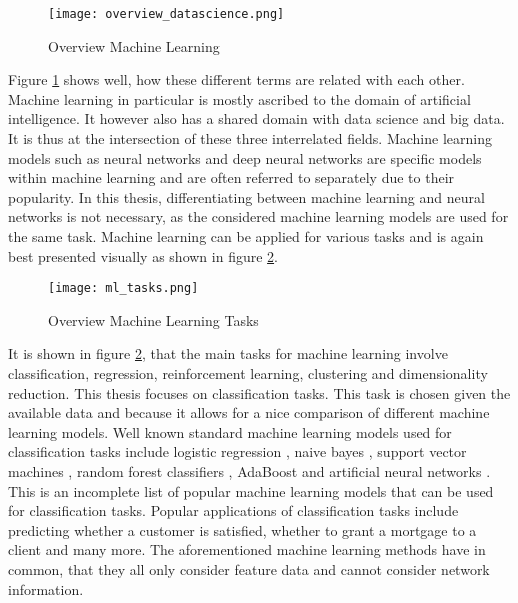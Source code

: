 	\begin{figure}[h]
		\centering
		\texttt{[image: overview\_datascience.png]}
		\caption{Overview Machine Learning}
		\citep{Frauenhofer2021}
		\label{fig:ml_overview}
	\end{figure} 

	\noindent Figure \ref{fig:ml_overview} shows well, how these different
	terms are related with each other. Machine learning in particular is
	mostly ascribed to the domain of artificial intelligence. It however also 
	has a shared domain with data science and big data. It is thus at the
	intersection of these three interrelated fields. Machine learning models 
	such as neural networks and deep neural networks are specific models within
	machine learning and are often referred to separately due to their
	popularity. In this thesis, differentiating between machine learning and
	neural networks is not necessary, as the considered machine learning models
	are used for the same task. Machine learning can be applied for various
	tasks and is again best presented visually as shown in figure 
	\ref{fig:ml_tasks}.

	\begin{figure}[h]
		\centering
		\texttt{[image: ml\_tasks.png]}
		\caption{Overview Machine Learning Tasks}
		\citep{Artisan2020}
		\label{fig:ml_tasks}
	\end{figure} 

	\noindent It is shown in figure \ref{fig:ml_tasks}, that the main tasks for
	machine learning involve classification, regression, reinforcement
	learning, clustering and dimensionality reduction. This thesis focuses on 
	classification tasks. This task is chosen given the available data and 
	because it allows for a nice comparison of different machine learning models. 
	Well known standard machine learning models used for classification tasks 
	include logistic regression \citep{cramer2002origins}, naive bayes 
	\citep{zhang2004bayes}, support vector machines 
	\citep{platt1999probabilistic}, random forest classifiers
	\citep{breiman2001random}, AdaBoost \citep{freund1997decision} and
	artificial neural networks \citep{mcculloch1943logical}. This is an
	incomplete list of popular machine learning models that can be used for
	classification tasks. Popular applications of classification tasks include 
	predicting whether a customer is satisfied, whether to grant a mortgage 
	to a client and many more. The aforementioned machine learning methods have 
	in common, that they all only consider feature data and cannot consider 
	network information. \\

